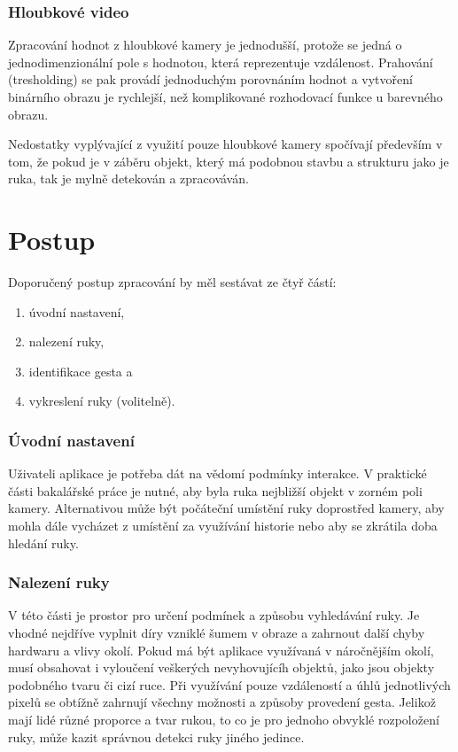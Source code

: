 \subsubsection{Hloubkové video}
Zpracování hodnot z hloubkové kamery je jednodušší, protože se jedná o jednodimenzionální pole s hodnotou, která reprezentuje vzdálenost. Prahování (tresholding) se pak provádí jednoduchým porovnáním hodnot a vytvoření binárního obrazu je rychlejší, než komplikované rozhodovací funkce u barevného obrazu.

Nedostatky vyplývající z využití pouze hloubkové kamery spočívají především v tom, že pokud je v záběru objekt, který má podobnou stavbu a strukturu jako je ruka, tak je mylně detekován a zpracováván.\\

\section{Postup}
Doporučený postup zpracování by měl sestávat ze čtyř částí:

\begin{enumerate}
\item úvodní nastavení,
\item nalezení ruky,
\item identifikace gesta a
\item vykreslení ruky (volitelně).
\end{enumerate}

\subsubsection{Úvodní nastavení}
Uživateli aplikace je potřeba dát na vědomí podmínky interakce. V praktické části bakalářské práce je nutné, aby byla ruka nejbližší objekt v zorném poli kamery. Alternativou může být počáteční umístění ruky doprostřed kamery, aby mohla dále vycházet z umístění za využívání historie nebo aby se zkrátila doba hledání ruky.

\subsubsection{Nalezení ruky}
V této části je prostor pro určení podmínek a způsobu vyhledávání ruky. Je vhodné nejdříve vyplnit díry vzniklé šumem v obraze a zahrnout další chyby hardwaru a vlivy okolí. Pokud má být aplikace využívaná v náročnějším okolí, musí obsahovat i vyloučení veškerých nevyhovujícíh objektů, jako jsou objekty podobného tvaru či cizí ruce. Při využívání pouze vzdáleností a úhlů jednotlivých pixelů se obtížně zahrnují všechny možnosti a způsoby provedení gesta. Jelikož mají lidé různé proporce a tvar rukou, to co je pro jednoho obvyklé rozpoložení ruky, může kazit správnou detekci ruky jiného jedince.

